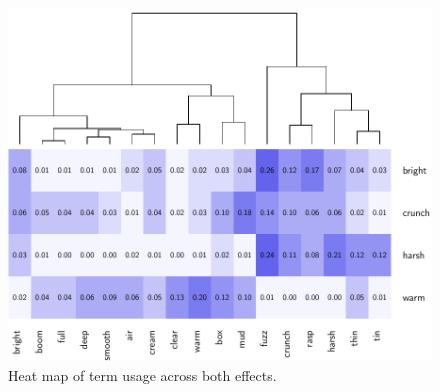 		\begin{figure}[h!]
			\centering
			\includegraphics{chapter7/Images/CombinedConfusion.pdf}
			\caption{Heat map of term usage across both effects.}
			\label{fig:CombConfusion}
		\end{figure}

